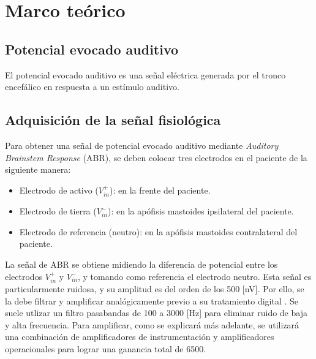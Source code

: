 \section{Marco teórico} \label{marco_teorico}

\subsection{Potencial evocado auditivo}

El potencial evocado auditivo es una señal eléctrica generada por el tronco encefálico en respuesta a un estímulo auditivo.

\subsection{Adquisición de la señal fisiológica}

Para obtener una señal de potencial evocado auditivo mediante \textit{Auditory Brainstem Response} (ABR), se deben
colocar tres electrodos en el paciente de la siguiente manera:

\begin{itemize}
    \item Electrodo de activo ($V_{in}^{+}$): en la frente del paciente.
    \item Electrodo de tierra ($V_{in}^{-}$): en la apófisis mastoides ipsilateral del paciente.
    \item Electrodo de referencia (neutro): en la apófisis mastoides contralateral del paciente.
\end{itemize}

La señal de ABR se obtiene midiendo la diferencia de potencial entre los electrodos $V_{in}^{+}$ y $V_{in}^{-}$, y
tomando como referencia el electrodo neutro.
Esta señal es particularmente ruidosa, y su amplitud es del orden de los 500 [nV]. Por ello, se la debe filtrar y
amplificar analógicamente previo a su tratamiento digital \cite{shojaeemend_automated_2018}.
Se suele utlizar un filtro pasabandas de 100 a 3000 [Hz] para eliminar ruido de baja y alta frecuencia.
Para amplificar, como se explicará más adelante, se utilizará una combinación de amplificadores de instrumentación y
amplificadores operacionales para lograr una ganancia total de 6500.
